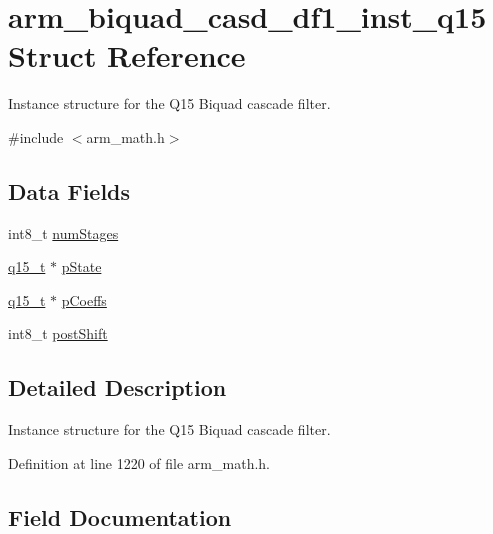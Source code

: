 \hypertarget{structarm__biquad__casd__df1__inst__q15}{}\section{arm\+\_\+biquad\+\_\+casd\+\_\+df1\+\_\+inst\+\_\+q15 Struct Reference}
\label{structarm__biquad__casd__df1__inst__q15}


Instance structure for the Q15 Biquad cascade filter.  




{\ttfamily \#include $<$arm\+\_\+math.\+h$>$}

\subsection*{Data Fields}
\begin{DoxyCompactItemize}
\item 
int8\+\_\+t \hyperlink{structarm__biquad__casd__df1__inst__q15_af59c4ceb94f92d6613492b37e7c949de}{num\+Stages}
\item 
\hyperlink{arm__math_8h_ab5a8fb21a5b3b983d5f54f31614052ea}{q15\+\_\+t} $\ast$ \hyperlink{structarm__biquad__casd__df1__inst__q15_ae29dfdb736374fcddaeaec4b7770170c}{p\+State}
\item 
\hyperlink{arm__math_8h_ab5a8fb21a5b3b983d5f54f31614052ea}{q15\+\_\+t} $\ast$ \hyperlink{structarm__biquad__casd__df1__inst__q15_a7ca181a37f714d174445f486bebce26f}{p\+Coeffs}
\item 
int8\+\_\+t \hyperlink{structarm__biquad__casd__df1__inst__q15_a3603cbf084938b6931bcb05dfe487f09}{post\+Shift}
\end{DoxyCompactItemize}


\subsection{Detailed Description}
Instance structure for the Q15 Biquad cascade filter. 

Definition at line 1220 of file arm\+\_\+math.\+h.



\subsection{Field Documentation}
